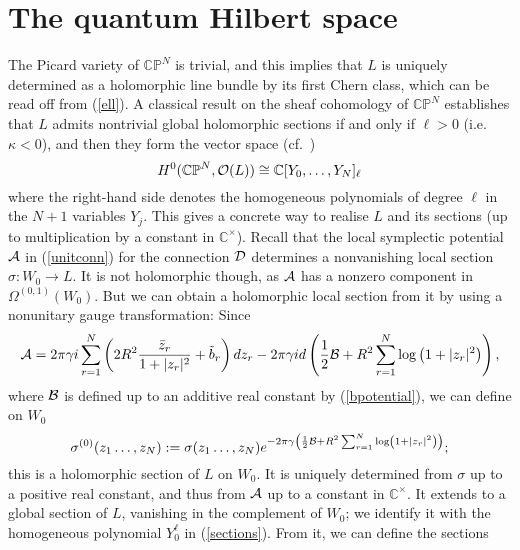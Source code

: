 \documentclass[a4paper,11pt]{article}
\begin{document}
\section{The quantum Hilbert space}


The Picard variety of $\mathbb{CP}^{N}$ is trivial, and this implies that
$L$ is uniquely determined as a holomorphic line bundle by its first
Chern class, which can be read off from (\ref{ell}).
A classical result on the sheaf cohomology of $\mathbb{CP}^{N}$ 
establishes that $L$ admits nontrivial global
holomorphic sections if and only if $\ell>0$ (i.e. $\kappa<0$), and
then they form the vector space (cf.~\cite{Har})
\begin{equation}\label{sections}
H^{0}(\mathbb{CP}^{N}, {\cal O}(L))
\cong \mathbb{C}[Y_{0},\ldots,Y_{N}]_{\ell}
\end{equation}
where the right-hand side denotes the homogeneous polynomials of 
degree $\ell$ in the $N+1$ variables $Y_{j}$. 
This gives a concrete way to realise $L$ and its sections (up to
multiplication by a constant in $\mathbb{C}^{\times}$). Recall that
the local symplectic potential ${\cal A}$ in (\ref{unitconn}) for the 
connection ${\cal D}$ determines a nonvanishing local section 
$\sigma: W_{0}\rightarrow L$. It is not holomorphic though, as 
${\cal A}$ has a nonzero component in 
$\Omega^{(0,1)}(W_{0})$. But we can obtain a holomorphic local section
from it by using a nonunitary gauge transformation: Since
\begin{equation}\label{sigtosig0}
{\cal A} = 2 \pi  \gamma i \sum_{r=1}^{N}
\left( 2 R^{2}\frac{\bar{z}_{r}}{1+|z_{r}|^{2}}+\tilde{b}_{r}\right)dz_{r}
-2\pi \gamma i d\left(
\frac{1}{2}{\cal B}+R^{2}\sum_{r=1}^{N}{\rm log}\left( 1+|z_{r}|^{2}\right)
\right),
\end{equation}
where ${\cal B}$ is defined up to an additive real constant by 
(\ref{bpotential}), we can define on $W_{0}$
\begin{equation}\label{holsec}
\sigma^{(0)}(z_{1}\ldots,z_{N}):=\sigma(z_{1}\ldots,z_{N})e^{-2\pi\gamma
\left(
\frac{1}{2}{\cal B}+R^{2}\sum_{r=1}^{N}{\rm log}\left( 1+|z_{r}|^{2}\right)
\right)};
\end{equation}
this is a holomorphic section of $L$ on $W_{0}$. It is uniquely
determined from $\sigma$ up to a positive real constant, and thus from
${\cal A}$ up to a constant in $\mathbb{C}^{\times}$. It extends to a global
section of $L$, vanishing in the complement of $W_{0}$;
we identify it with
the homogeneous polynomial $Y_{0}^{\ell}$ in (\ref{sections}). From
it, we can define the sections
\end{document}
